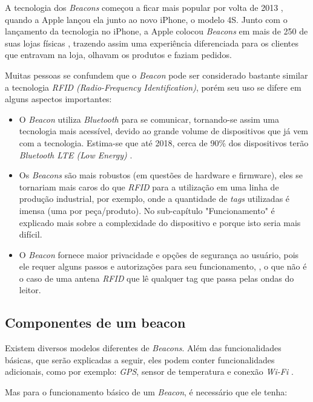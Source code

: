 \documentclass[
	12pt,
	oneside,
	a4paper,
	english,
	brazil,
]{abntex2}
\begin{document}
A tecnologia dos \emph{Beacons} começou a ficar mais popular por volta de 2013 \cite{beacon-what-is-it-forbes}, quando a Apple lançou ela junto ao novo iPhone, o modelo 4S. Junto com o lançamento da tecnologia no iPhone, a Apple colocou \emph{Beacons} em mais de 250 de suas lojas físicas \cite{beacon-apple-store-case}, trazendo assim uma experiência diferenciada para os clientes que entravam na loja, olhavam os produtos e faziam pedidos.

Muitas pessoas se confundem que o \emph{Beacon} pode ser considerado bastante similar a tecnologia \emph{RFID (Radio-Frequency Identification)}, porém seu uso se difere em alguns aspectos importantes:

\begin{itemize}
    \item O \emph{Beacon} utiliza \emph{Bluetooth} para se comunicar, tornando-se assim uma tecnologia mais acessível, devido ao grande volume de dispositivos que já vem com a tecnologia. Estima-se que até 2018, cerca de 90\% dos dispositivos terão \emph{Bluetooth LTE (Low Energy)} \cite{beacon-devices-estimate-2018}.
    \item Os \emph{Beacons} são mais robustos (em questões de hardware e firmware), eles se tornariam mais caros do que \emph{RFID} para a utilização em uma linha de produção industrial, por exemplo, onde a quantidade de \emph{tags} utilizadas é imensa (uma por peça/produto). No sub-capítulo "Funcionamento" é explicado mais sobre a complexidade do dispositivo e porque isto seria mais difícil.
    \item O \emph{Beacon} fornece maior privacidade e opções de segurança ao usuário, pois ele requer alguns passos e autorizações para seu funcionamento, \cite{beacon-apple-store-case}, o que não é o caso de uma antena \emph{RFID} que lê qualquer tag que passa pelas ondas do leitor.
\end{itemize}

\subsection{Componentes de um beacon}

Existem diversos modelos diferentes de \emph{Beacons}. Além das funcionalidades básicas, que serão explicadas a seguir, eles podem conter funcionalidades adicionais, como por exemplo: \emph{GPS}, sensor de temperatura e conexão \emph{Wi-Fi} \cite{beacon-sensors-easy-kontakt}.

Mas para o funcionamento básico de um \emph{Beacon}, é necessário que ele tenha:
\end{document}
